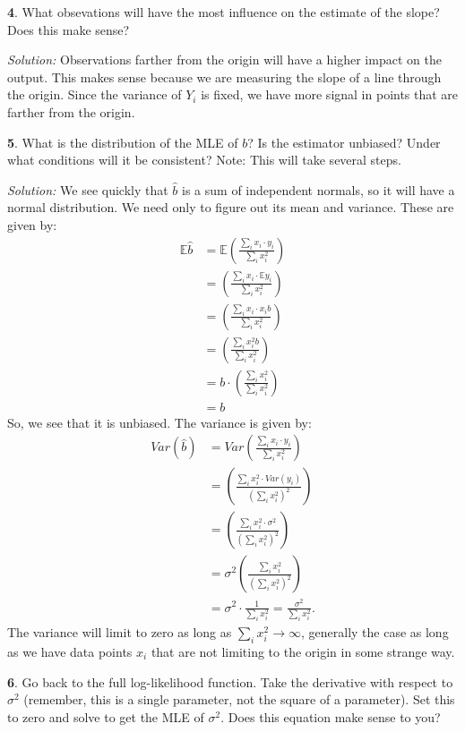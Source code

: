 \documentclass{tufte-handout}
\begin{document}
\textbf{4}. What obsevations will have the most influence on the estimate of the slope?
Does this make sense?

\textit{Solution:} Observations farther from the origin will have a higher impact on the output.
This makes sense because we are measuring the slope of a line through the origin.
Since the variance of $Y_i$ is fixed, we have more signal in points that are 
farther from the origin.

\textbf{5}. What is the distribution of the MLE of $b$? Is the estimator unbiased? Under
what conditions will it be consistent? Note: This will take several steps.

\textit{Solution:} We see quickly that $\widehat{b}$ is a sum of independent normals, so it will 
have a normal distribution. We need only to figure out its mean and variance.
These are given by:
\begin{align*}
\mathbb{E} \widehat{b} &= \mathbb{E} \left( \frac{\sum_i x_i \cdot y_i}{\sum_i x_i^2} \right) \\
&= \left( \frac{\sum_i x_i \cdot \mathbb{E} y_i}{\sum_i x_i^2} \right) \\
&= \left( \frac{\sum_i x_i \cdot x_i b}{\sum_i x_i^2} \right) \\
&= \left( \frac{\sum_i x_i^2 b}{\sum_i x_i^2} \right) \\
&= b \cdot \left( \frac{\sum_i x_i^2}{\sum_i x_i^2} \right) \\
&= b
\end{align*}
So, we see that it is unbiased. The variance is given by:
\begin{align*}
Var (\widehat{b}) &= Var \left( \frac{\sum_i x_i \cdot y_i}{\sum_i x_i^2} \right) \\
&= \left( \frac{\sum_i x_i^2 \cdot Var (y_i)}{\left(\sum_i x_i^2\right)^2} \right) \\
&= \left( \frac{\sum_i x_i^2 \cdot \sigma^2}{\left(\sum_i x_i^2\right)^2} \right) \\
&= \sigma^2 \left( \frac{\sum_i x_i^2}{\left(\sum_i x_i^2\right)^2} \right) \\
&= \sigma^2 \cdot  \frac{1}{\sum_i x_i^2} = \frac{\sigma^2}{\sum_i x_i^2}.
\end{align*}
The variance will limit to zero as long as $\sum_i x_i^2 \rightarrow \infty$,
generally the case as long as we have data points $x_i$ that are not limiting
to the origin in some strange way.

\textbf{6}. Go back to the full log-likelihood function. Take the derivative with respect
to $\sigma^2$ (remember, this is a single parameter, not the square of a parameter).
Set this to zero and solve to get the MLE of $\sigma^2$. Does this equation make
sense to you?
\end{document}
